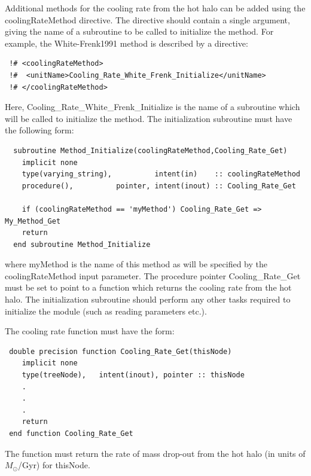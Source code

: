 Additional methods for the cooling rate from the hot halo can be added using the {\normalfont \ttfamily coolingRateMethod} directive. The directive should contain a single argument, giving the name of a subroutine to be called to initialize the method. For example, the {\normalfont \ttfamily White-Frenk1991} method is described by a directive:
\begin{verbatim}
 !# <coolingRateMethod>
 !#  <unitName>Cooling_Rate_White_Frenk_Initialize</unitName>
 !# </coolingRateMethod>
\end{verbatim}
Here, {\normalfont \ttfamily Cooling\_Rate\_White\_Frenk\_Initialize} is the name of a subroutine which will be called to initialize the method. The initialization subroutine must have the following form:
\begin{verbatim}
  subroutine Method_Initialize(coolingRateMethod,Cooling_Rate_Get)
    implicit none
    type(varying_string),          intent(in)    :: coolingRateMethod
    procedure(),          pointer, intent(inout) :: Cooling_Rate_Get
    
    if (coolingRateMethod == 'myMethod') Cooling_Rate_Get => My_Method_Get
    return
  end subroutine Method_Initialize
\end{verbatim}
where {\normalfont \ttfamily myMethod} is the name of this method as will be specified by the {\normalfont \ttfamily coolingRateMethod} input parameter. The procedure pointer {\normalfont \ttfamily Cooling\_Rate\_Get} must be set to point to a function which returns the cooling rate from the hot halo. The initialization subroutine should perform any other tasks required to initialize the module (such as reading parameters etc.).

The cooling rate function must have the form:
\begin{verbatim}
 double precision function Cooling_Rate_Get(thisNode)
    implicit none
    type(treeNode),   intent(inout), pointer :: thisNode
    .
    .
    .
    return
 end function Cooling_Rate_Get
\end{verbatim}
The function must return the rate of mass drop-out from the hot halo (in units of $M_\odot$/Gyr) for {\normalfont \ttfamily thisNode}. 

